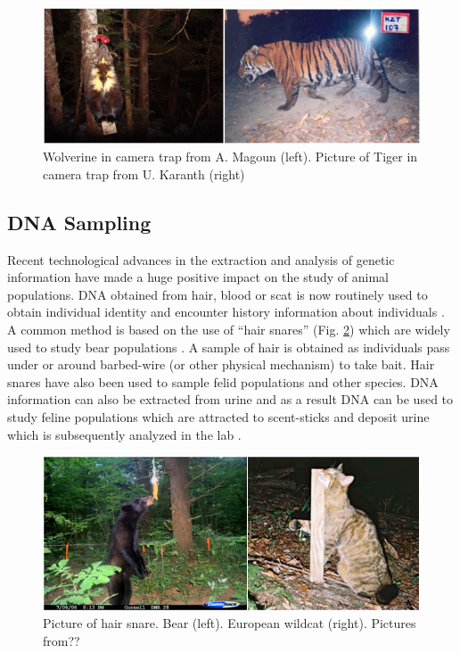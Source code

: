 \begin{figure}
\begin{center}
\includegraphics[width=5in]{Ch1/figs/wolverinetiger}
\end{center}
\caption{Wolverine in camera trap from A. Magoun (left). Picture of Tiger in
  camera trap from U. Karanth (right)}
\label{fig.wolverinetiger}
\end{figure}

\subsection{DNA Sampling}

Recent technological advances in the extraction and analysis of
genetic information have made a huge positive impact on the study of 
animal populations. DNA obtained from hair, blood or scat is now
routinely used to obtain individual identity and encounter history
information about individuals \citep{taberlet_bouvent:1992,
  woods_etal:1999, mills_etal:2000, schwartz_monfort:2008}.  A common
method is based on the use of ``hair snares'' (Fig. \ref{fig.bearcat})
which are widely used to study bear populations
\citep{woods_etal:1999, gardner_etal:2010, garshelis_etal:2006,
  kendall_etal:2009}.  A sample of hair is obtained as individuals
pass under or around barbed-wire (or other physical mechanism) to take
bait. Hair snares have also been used to sample felid populations
\citep{garciaalaniz_etal:2010} and other species. DNA information can
also be extracted from urine and as a result DNA can be used to study
feline populations which are attracted to scent-sticks and deposit
urine which is subsequently analyzed in the lab
\citep{valiere_taberlet:2000, kery_etal:2010}.


\begin{figure}
\begin{center}
\includegraphics[width=5in]{Ch1/figs/bearcat}
\end{center}
\caption{Picture of hair snare. Bear (left). European wildcat
  (right). Pictures from??}
\label{fig.bearcat}
\end{figure}

